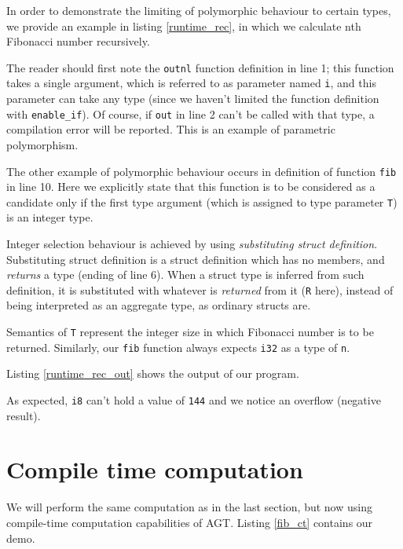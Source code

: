 \documentclass[times, utf8, diplomski]{fer}
\theoremstyle{definition}
\newcommand{\textcode}[3]{
    
}
\begin{document}
In order to demonstrate the limiting of polymorphic behaviour to certain types, we provide
an example in listing \ref{runtime_rec}, in which we calculate nth Fibonacci number recursively.

\textcode{\resdir/programs/fib_runtime_recursion.agt}{runtime_rec}
{Fibonacci with recursion, Parametric Polymorphism}

The reader should first note the \texttt{outnl} function definition in line 1;
this function takes a single argument, which is referred to as parameter named \texttt{i},
and this parameter can take any type (since we haven't limited the function definition 
with \texttt{enable\_if}).
Of course, if \texttt{out} in line 2 can't be called with that type, a compilation error will be
reported. This is an example of parametric polymorphism.

The other example of polymorphic behaviour occurs in definition of function \texttt{fib} in line 10.
Here we explicitly state that this function is to be considered as a candidate only if
the first type argument (which is assigned to type parameter \texttt{T}) is an integer type.

Integer selection behaviour is achieved by using \textit{substituting struct definition}.
Substituting struct definition is a struct definition which has no members,
and \textit{returns} a type (ending of line 6). When a struct type is inferred from such definition,
it is substituted with whatever is \textit{returned} from it (\texttt{R} here), 
instead of being interpreted as an aggregate type, as ordinary structs are.

Semantics of \texttt{T} represent the integer size in which Fibonacci number is to be returned.
Similarly, our \texttt{fib} function always expects \texttt{i32} as a type of \texttt{n}.

Listing \ref{runtime_rec_out} shows the output of our program.

\textcode{\resdir/programs/fib_runtime_recursion.out}{runtime_rec_out}{Fibonacci with recursion - output}

As expected, \texttt{i8} can't hold a value of \texttt{144} and we notice an overflow (negative result).


\section{Compile time computation}

We will perform the same computation as in the last section, but now using compile-time 
computation capabilities of AGT. Listing \ref{fib_ct} contains our demo.
\end{document}
